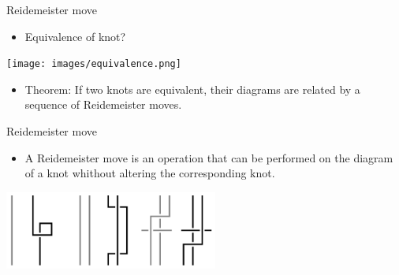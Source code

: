 \begin{frame}{Reidemeister move}
	\begin{itemize}
		\item Equivalence of knot?
	\end{itemize}
	\centering
	\texttt{[image: images/equivalence.png]}
	
	\begin{itemize}
		\item Theorem: If two knots are equivalent, their diagrams are related by a sequence of Reidemeister moves.
	\end{itemize}
\end{frame}

\begin{frame}{Reidemeister move}
	\begin{itemize}
		\item A Reidemeister move is an operation that can be performed on the diagram
		of a knot whithout altering the corresponding knot.
	\end{itemize}
	\centering
	\includegraphics[width=7cm]{images/r.png}
\end{frame}